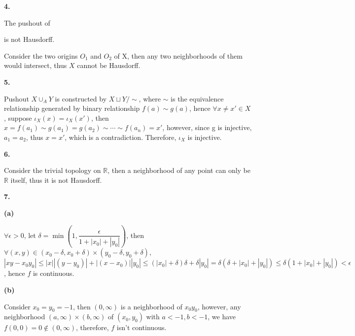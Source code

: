 \documentclass[../main.tex]{subfiles}
\begin{document}
\textbf{4.} \par\noindent
The pushout of 
\begin{center}
\end{center}
is not Hausdorff. \par\noindent
Consider the two origins $O_{1}$ and $O_{2}$ of X, then any two neighborhoods of them would intersect, thus $X$ cannot be Hausdorff. \par\par\noindent
\textbf{5.} \par\noindent
Pushout $X\cup_{A}Y$ is constructed by $X\sqcup Y / \sim$, where $\sim$ is the equivalence relationship generated by binary relationship $f(a)\sim g(a)$, hence $\forall x\neq x'\in X$, suppose $\iota_{X}(x)=\iota_{X}(x')$, then $ x = f(a_{1}) \sim g(a_{1}) = g(a_{2}) \sim \cdots \sim f(a_{n}) = x' $, however, since g is injective, $a_{1}=a_{2}$, thus $x=x'$, which is a contradiction. Therefore, $\iota_{X}$ is injective. \par\par\noindent
\textbf{6.} \par\noindent
Consider the trivial topology on $\mathbb{R}$, then a neighborhood of any point can only be $\mathbb{R}$ itself, thus it is not Hausdorff. \par\par\noindent
\textbf{7.} \par\noindent
\textbf{(a)} \par\noindent
$\forall \epsilon>0$, let $\delta=\min\left(1,\dfrac{\epsilon}{1+|x_{0}|+|y_{0}|}\right)$, then $\forall (x,y)\in(x_{0}-\delta,x_{0}+\delta)\times(y_{0}-\delta,y_{0}+\delta)$, $|xy-x_{0}y_{0}|\leq|x||(y-y_{0})|+|(x-x_{0})||y_{0}|\leq(|x_{0}|+\delta)\delta+\delta|y_{0}|=\delta(\delta+|x_{0}|+|y_{0}|)\leq\delta(1+|x_{0}|+|y_{0}|) < \epsilon$, hence $f$ is continuous. \par\noindent
\textbf{(b)} \par\noindent
Consider $x_{0}=y_{0}=-1$, then $(0,\infty)$ is a neighborhood of $x_{0}y_{0}$, however, any neighborhood $(a,\infty)\times(b,\infty)$ of $(x_{0},y_{0})$ with $a<-1,b<-1$, we have $f(0,0)=0\notin (0,\infty)$, therefore, $f$ isn't continuous.
\end{document}
